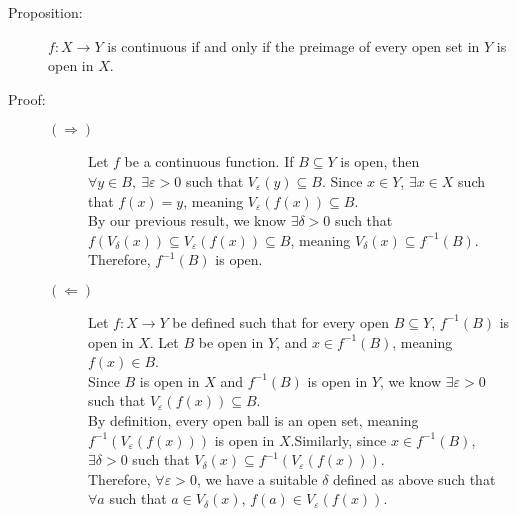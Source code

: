 \documentclass[12pt]{extarticle}
\begin{document}
  \begin{description}
    \item[Proposition:] $f: X\rightarrow Y$ is continuous if and only if the preimage of every open set in $Y$ is open in $X$.
    \item[Proof:]
      \begin{description}
        \item[$(\Rightarrow)$] Let $f$ be a continuous function. If $B\subseteq Y$ is open, then $\forall y\in B,~\exists \varepsilon > 0$ such that $V_{\varepsilon}(y) \subseteq B$. Since $x\in Y$, $\exists x\in X$ such that $f(x) = y$, meaning $V_{\varepsilon}(f(x)) \subseteq B$.\\

          By our previous result, we know $\exists \delta > 0$ such that $f(V_{\delta}(x))\subseteq V_{\varepsilon}(f(x))\subseteq B$, meaning $V_{\delta}(x) \subseteq f^{-1}(B)$. Therefore, $f^{-1}(B)$ is open.
        \item[$(\Leftarrow)$] Let $f: X \rightarrow Y$ be defined such that for every open $B\subseteq Y$, $f^{-1}(B)$ is open in $X$. Let $B$ be open in $Y$, and $x\in f^{-1}(B)$, meaning $f(x)\in B$.\\

          Since $B$ is open in $X$ and $f^{-1}(B)$ is open in $Y$, we know $\exists \varepsilon > 0$ such that $V_{\varepsilon}(f(x))\subseteq B$.\\

          By definition, every open ball is an open set, meaning $f^{-1}(V_{\varepsilon}(f(x)))$ is open in $X$.Similarly, since $x\in f^{-1}(B)$, $\exists \delta > 0$ such that $V_{\delta}(x)\subseteq f^{-1}(V_{\varepsilon}(f(x)))$.\\

          Therefore, $\forall \varepsilon > 0$, we have a suitable $\delta$ defined as above such that $\forall a$ such that $a\in V_{\delta}(x)$, $f(a)\in V_{\varepsilon}(f(x))$.
      \end{description}
  \end{description}
\end{document}
